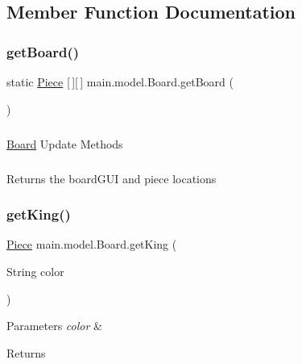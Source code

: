 \subsection{Member Function Documentation}
\hypertarget{classmain_1_1model_1_1_board_af7321b4ae3a390e48d3dd6c188de5d2e}{}\label{classmain_1_1model_1_1_board_af7321b4ae3a390e48d3dd6c188de5d2e} 
\subsubsection{\texorpdfstring{get\+Board()}{getBoard()}}
{\footnotesize\ttfamily static \hyperlink{classmain_1_1pieces_1_1_piece}{Piece} \mbox{[}$\,$\mbox{]}\mbox{[}$\,$\mbox{]} main.\+model.\+Board.\+get\+Board (\begin{DoxyParamCaption}{ }\end{DoxyParamCaption})\hspace{0.3cm}{\ttfamily [static]}}

\subparagraph*{}

\hyperlink{classmain_1_1model_1_1_board}{Board} Update Methods \subparagraph*{}

Returns the board\+G\+UI and piece locations \hypertarget{classmain_1_1model_1_1_board_a58b12960567f10637634a020d9bc7ed6}{}\label{classmain_1_1model_1_1_board_a58b12960567f10637634a020d9bc7ed6} 
\subsubsection{\texorpdfstring{get\+King()}{getKing()}}
{\footnotesize\ttfamily \hyperlink{classmain_1_1pieces_1_1_piece}{Piece} main.\+model.\+Board.\+get\+King (\begin{DoxyParamCaption}\item[{String}]{color }\end{DoxyParamCaption})}


\begin{DoxyParams}{Parameters}
{\em color} & \\
\hline
\end{DoxyParams}
\begin{DoxyReturn}{Returns}

\end{DoxyReturn}
\hypertarget{classmain_1_1model_1_1_board_a9be517cf5bb1584069e14d202b4d708b}{}\label{classmain_1_1model_1_1_board_a9be517cf5bb1584069e14d202b4d708b} 
